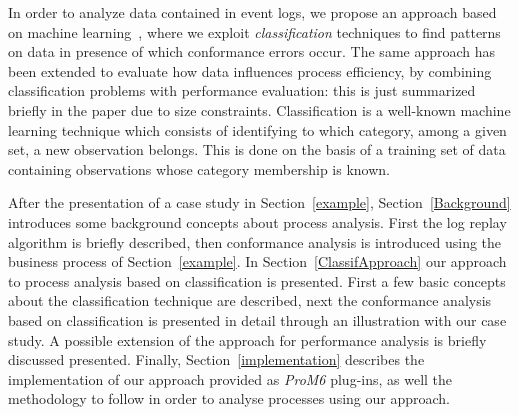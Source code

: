 \documentclass{llncs}
\begin{document}
In order to analyze data contained in event logs, we propose an approach based on {machine learning}~\cite{tan2005introduction}, where we exploit \emph{classification} techniques to find patterns on data in presence of which conformance errors occur. The same approach has been extended to evaluate how data influences  process efficiency, by combining classification problems with performance evaluation: this is just summarized briefly in the paper due to size constraints.  Classification is a well-known {machine learning} technique which consists of identifying to which category, among a given set, a new observation belongs. This is done on the basis of a training set of data containing observations whose category membership is known.



After the presentation of a case study in Section~\ref{example}, Section~\ref{Background} introduces some background concepts about process analysis. First the log replay algorithm is briefly described, then conformance  analysis is introduced using the business process of Section~\ref{example}. In Section~\ref{ClassifApproach} our approach to process analysis based on classification is presented. First a few basic concepts about the classification technique are described, next the conformance analysis based on classification is presented in detail through an illustration with our case study.  A possible extension of the approach for performance analysis is briefly discussed presented. Finally, Section~\ref{implementation} describes the implementation of our approach provided as \emph{ProM6}\cite{DBLP:conf/bpm/AalstDGRVW09} plug-ins, as well the methodology to follow in order to analyse processes using our approach.
\end{document}
